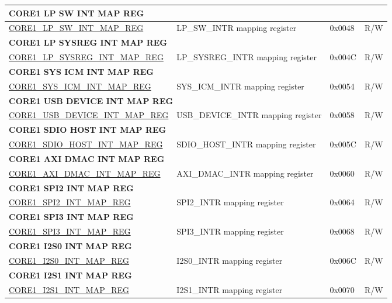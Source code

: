 \begin{longtable}{ | p{7.5cm} | p{7.2cm} | p{1.3cm} | p{1cm} | }
\multicolumn{4}{|l|}{\textbf{CORE1 LP SW INT MAP REG}} \\ \hline
\hyperref[regdesc:CORE1LPSWINTMAPREG]{CORE1\_LP\_SW\_INT\_MAP\_REG} & LP\_SW\_INTR mapping register & 0x0048 & R/W \\ \hline
\multicolumn{4}{|l|}{\textbf{CORE1 LP SYSREG INT MAP REG}} \\ \hline
\hyperref[regdesc:CORE1LPSYSREGINTMAPREG]{CORE1\_LP\_SYSREG\_INT\_MAP\_REG} & LP\_SYSREG\_INTR mapping register & 0x004C & R/W \\ \hline
\multicolumn{4}{|l|}{\textbf{CORE1 SYS ICM INT MAP REG}} \\ \hline
\hyperref[regdesc:CORE1SYSICMINTMAPREG]{CORE1\_SYS\_ICM\_INT\_MAP\_REG} & SYS\_ICM\_INTR mapping register & 0x0054 & R/W \\ \hline
\multicolumn{4}{|l|}{\textbf{CORE1 USB DEVICE INT MAP REG}} \\ \hline
\hyperref[regdesc:CORE1USBDEVICEINTMAPREG]{CORE1\_USB\_DEVICE\_INT\_MAP\_REG} & USB\_DEVICE\_INTR mapping register & 0x0058 & R/W \\ \hline
\multicolumn{4}{|l|}{\textbf{CORE1 SDIO HOST INT MAP REG}} \\ \hline
\hyperref[regdesc:CORE1SDIOHOSTINTMAPREG]{CORE1\_SDIO\_HOST\_INT\_MAP\_REG} & SDIO\_HOST\_INTR mapping register & 0x005C & R/W \\ \hline
\multicolumn{4}{|l|}{\textbf{CORE1 AXI DMAC INT MAP REG}} \\ \hline
\hyperref[regdesc:CORE1AXIDMACINTMAPREG]{CORE1\_AXI\_DMAC\_INT\_MAP\_REG} & AXI\_DMAC\_INTR mapping register & 0x0060 & R/W \\ \hline
\multicolumn{4}{|l|}{\textbf{CORE1 SPI2 INT MAP REG}} \\ \hline
\hyperref[regdesc:CORE1SPI2INTMAPREG]{CORE1\_SPI2\_INT\_MAP\_REG} & SPI2\_INTR mapping register & 0x0064 & R/W \\ \hline
\multicolumn{4}{|l|}{\textbf{CORE1 SPI3 INT MAP REG}} \\ \hline
\hyperref[regdesc:CORE1SPI3INTMAPREG]{CORE1\_SPI3\_INT\_MAP\_REG} & SPI3\_INTR mapping register & 0x0068 & R/W \\ \hline
\multicolumn{4}{|l|}{\textbf{CORE1 I2S0 INT MAP REG}} \\ \hline
\hyperref[regdesc:CORE1I2S0INTMAPREG]{CORE1\_I2S0\_INT\_MAP\_REG} & I2S0\_INTR mapping register & 0x006C & R/W \\ \hline
\multicolumn{4}{|l|}{\textbf{CORE1 I2S1 INT MAP REG}} \\ \hline
\hyperref[regdesc:CORE1I2S1INTMAPREG]{CORE1\_I2S1\_INT\_MAP\_REG} & I2S1\_INTR mapping register & 0x0070 & R/W \\ \hline

\end{longtable}
